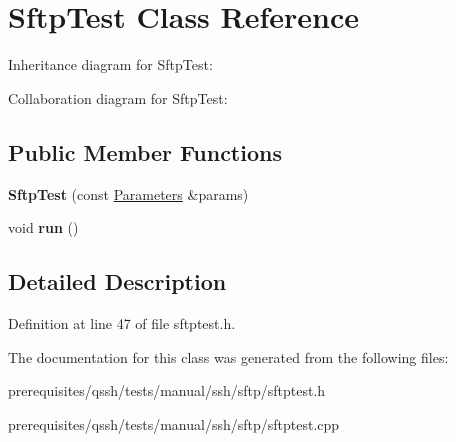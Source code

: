 \hypertarget{class_sftp_test}{}\section{Sftp\+Test Class Reference}
\label{class_sftp_test}


Inheritance diagram for Sftp\+Test\+:


Collaboration diagram for Sftp\+Test\+:
\subsection*{Public Member Functions}
\begin{DoxyCompactItemize}
\item 
\mbox{\label{class_sftp_test_ae232c2aaa264e4a80eb97eae73c90494}} 
{\bfseries Sftp\+Test} (const \mbox{\hyperlink{struct_parameters}{Parameters}} \&params)
\item 
\mbox{\label{class_sftp_test_ad56c263aae00c9428180c92825f8b6c2}} 
void {\bfseries run} ()
\end{DoxyCompactItemize}


\subsection{Detailed Description}


Definition at line 47 of file sftptest.\+h.



The documentation for this class was generated from the following files\+:\begin{DoxyCompactItemize}
\item 
prerequisites/qssh/tests/manual/ssh/sftp/sftptest.\+h\item 
prerequisites/qssh/tests/manual/ssh/sftp/sftptest.\+cpp\end{DoxyCompactItemize}

